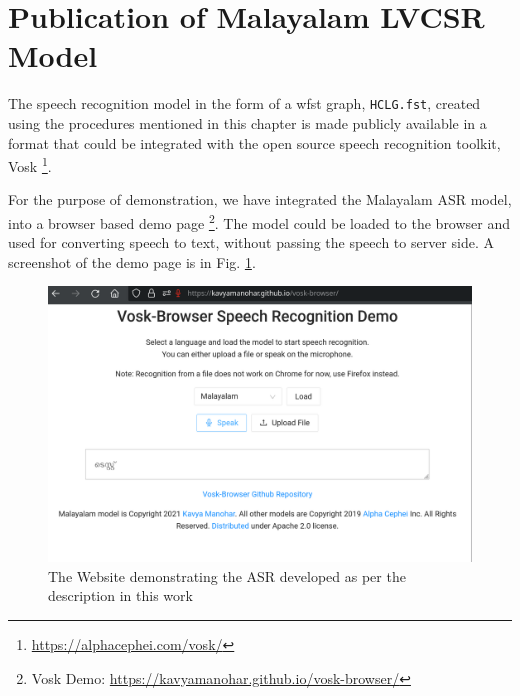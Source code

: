 

\section{Publication of Malayalam LVCSR Model}

The speech recognition model in the form of a \gls{wfst} graph, \texttt{HCLG.fst}, created using
the procedures mentioned in this chapter is made publicly available in a format
that could be integrated with the open source speech recognition toolkit, Vosk
\footnote{\url{https://alphacephei.com/vosk/}}.

For the purpose of demonstration, we have integrated the Malayalam ASR model,
into a browser based demo page \footnote{Vosk Demo: \url{https://kavyamanohar.github.io/vosk-browser/}}. The model could be loaded to the browser and used for converting speech to text, without passing the speech to server side. A
screenshot of the demo page is in Fig. \ref{fig:vosk}.

\begin{figure}[htpb]
	\centering
	\includegraphics[width=0.8\linewidth]{Figures/chapter5-lvcsr/vosk.png}
	\caption{The Website demonstrating the ASR developed as per the description in this work}
	\label{fig:vosk}
\end{figure}
